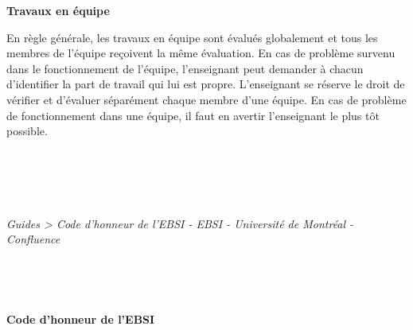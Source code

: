\documentclass [12 pt]{article}
\begin{document}
        \textbf{
        Travaux en équipe
        }
    
            En règle générale, les travaux en équipe sont évalués globalement et tous les membres
                de l'équipe reçoivent la même évaluation. En cas de problème survenu dans le
                fonctionnement de l'équipe, l'enseignant peut demander à chacun d'identifier la part
                de travail qui lui est propre. L'enseignant se réserve le droit de vérifier et
                d'évaluer séparément chaque membre d'une équipe. En cas de problème de
                fonctionnement dans une équipe, il faut en avertir l'enseignant le plus tôt
                possible.
        
    
    
        \newpage
        \section {
         
        }
        
        
        
        \textit{
        Guides > Code d'honneur de l'EBSI - EBSI - Université de Montréal -
            Confluence
        }
    
         
        
             
            
            
        \textbf{
        Code d'honneur de
                l'EBSI
        }
    
\end{document}
